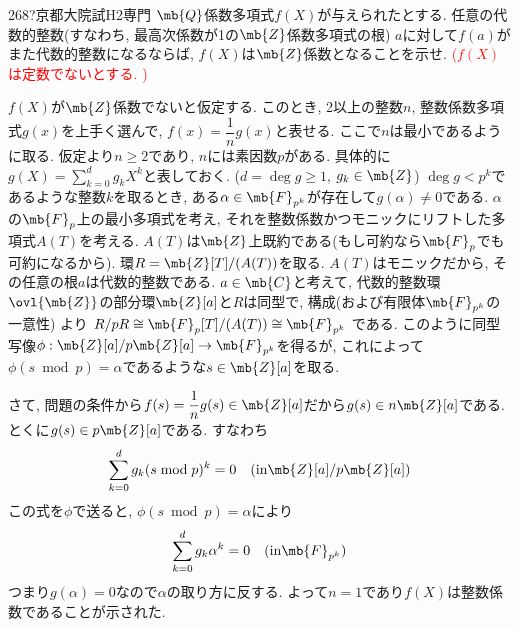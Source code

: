 \begin{prob}{268}{\hosi ?}{京都大院試H2専門}
$\mb{Q}$係数多項式$f(X)$が与えられたとする. 任意の代数的整数(すなわち, 最高次係数が1の$\mb{Z}$係数多項式の根) $a$に対して$f(a)$がまた代数的整数になるならば, $f(X)$は$\mb{Z}$係数となることを示せ. \textcolor{red}{($f(X)$は定数でないとする. )}
\end{prob}
$f(X)$が$\mb{Z}$係数でないと仮定する. このとき, 2以上の整数$n$, 整数係数多項式$g(x)$を上手く選んで, $f(x) = \dfrac{1}{n} g(x)$と表せる. ここで$n$は最小であるように取る. 仮定より$n\geq 2$であり, $n$には素因数$p$がある. 具体的に$g(X) = \sum_{k=0}^{d} g_k X^{k}$と表しておく. ($d = \deg{g} \geq 1$, $g_k \in \mb{Z}$)
 $\deg{g} < p^{k}$であるような整数$k$を取るとき, ある$\alpha\in \mb{F}_{p^{k}}$が存在して$g(\alpha)\neq 0$である. $\alpha$の$\mb{F}_{p}$上の最小多項式を考え, それを整数係数かつモニックにリフトした多項式$A(T)$を考える. $A(T)$は$\mb{Z}$上既約である(もし可約なら$\mb{F}_{p}$でも可約になるから). 環$R=\mb{Z}[T]/(A(T))$を取る. $A(T)$はモニックだから, その任意の根$a$は代数的整数である.  $a\in \mb{C}$と考えて, 代数的整数環$\ovl{\mb{Z}}$の部分環$\mb{Z}[a]$と$R$は同型で,  構成(および有限体$\mb{F}_{p^{k}}$の一意性) より $R/pR \cong \mb{F}_{p}[T]/(A(T)) \cong \mb{F}_{p^{k}}$ である. このように同型写像$\phi:\mb{Z}[a]/p\mb{Z}[a] \to \mb{F}_{p^{k}}$を得るが, これによって$\phi(s\bmod{p}) = \alpha$であるような$s\in \mb{Z}[a]$を取る.   \par 
さて, 問題の条件から$f(s) = \dfrac{1}{n} g(s) \in \mb{Z}[a]$だから$g(s)\in n\mb{Z}[a]$である. とくに$g(s) \in p\mb{Z}[a]$である. すなわち
\[
\sum_{k=0}^{d} g_k (s\bmod{p})^{k} = 0 \quad (\text{in}  \mb{Z}[a]/p\mb{Z}[a])
\]
この式を$\phi$で送ると, $\phi(s\bmod{p}) = \alpha$により
\[
\sum_{k=0}^{d} g_k \alpha^{k} = 0 \quad (\text{in} \mb{F}_{p^{k}})
\]
つまり$g(\alpha) = 0$なので$\alpha$の取り方に反する. よって$n=1$であり$f(X)$は整数係数であることが示された.  